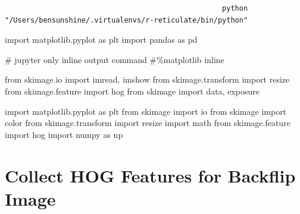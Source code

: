 \documentclass[
  letterpaper,
  DIV=11,
  numbers=noendperiod]{scrreprt}
\newenvironment{Shaded}{\begin{snugshade}}{\end{snugshade}}
\newcommand{\CommentTok}[1]{\textcolor[rgb]{0.37,0.37,0.37}{#1}}
\newcommand{\ImportTok}[1]{\textcolor[rgb]{0.00,0.46,0.62}{#1}}
\newcommand{\NormalTok}[1]{\textcolor[rgb]{0.00,0.23,0.31}{#1}}
\begin{document}
\begin{verbatim}
                                                   python 
"/Users/bensunshine/.virtualenvs/r-reticulate/bin/python" 
\end{verbatim}

\begin{Shaded}
\begin{Highlighting}[]

\ImportTok{import}\NormalTok{ matplotlib.pyplot }\ImportTok{as}\NormalTok{ plt}
\ImportTok{import}\NormalTok{ pandas }\ImportTok{as}\NormalTok{ pd}

\CommentTok{\# jupyter only inline output command}
\CommentTok{\#\%matplotlib inline}

\ImportTok{from}\NormalTok{ skimage.io }\ImportTok{import}\NormalTok{ imread, imshow}
\ImportTok{from}\NormalTok{ skimage.transform }\ImportTok{import}\NormalTok{ resize}
\ImportTok{from}\NormalTok{ skimage.feature }\ImportTok{import}\NormalTok{ hog}
\ImportTok{from}\NormalTok{ skimage }\ImportTok{import}\NormalTok{ data, exposure}


\ImportTok{import}\NormalTok{ matplotlib.pyplot }\ImportTok{as}\NormalTok{ plt}
\ImportTok{from}\NormalTok{ skimage }\ImportTok{import}\NormalTok{ io}
\ImportTok{from}\NormalTok{ skimage }\ImportTok{import}\NormalTok{ color}
\ImportTok{from}\NormalTok{ skimage.transform }\ImportTok{import}\NormalTok{ resize}
\ImportTok{import}\NormalTok{ math}
\ImportTok{from}\NormalTok{ skimage.feature }\ImportTok{import}\NormalTok{ hog}
\ImportTok{import}\NormalTok{ numpy }\ImportTok{as}\NormalTok{ np}
\end{Highlighting}
\end{Shaded}

\section{Collect HOG Features for Backflip
Image}\label{collect-hog-features-for-backflip-image}
\end{document}
